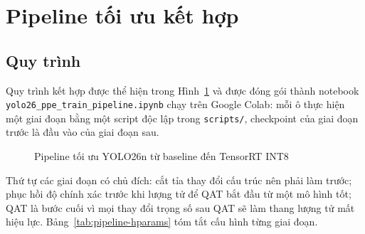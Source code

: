 \section{Pipeline tối ưu kết hợp}

\subsection{Quy trình}

Quy trình kết hợp được thể hiện trong Hình~\ref{fig:pruning-qat-pipeline} và
được đóng gói thành notebook \texttt{yolo26\_ppe\_train\_pipeline.ipynb} chạy trên
Google Colab: mỗi ô thực hiện một giai đoạn bằng một script độc lập trong
\texttt{scripts/}, checkpoint của giai đoạn trước là đầu vào của giai đoạn sau.

\begin{figure}[H]
\centering
{}
\caption{Pipeline tối ưu YOLO26n từ baseline đến TensorRT INT8}
\label{fig:pruning-qat-pipeline}
\end{figure}

Thứ tự các giai đoạn có chủ đích: cắt tỉa thay đổi cấu trúc nên phải làm trước;
phục hồi độ chính xác trước khi lượng tử để QAT bắt đầu từ một mô hình tốt;
QAT là bước cuối vì mọi thay đổi trọng số sau QAT sẽ làm thang lượng tử mất
hiệu lực. Bảng~\ref{tab:pipeline-hparams} tóm tắt cấu hình từng giai đoạn.

